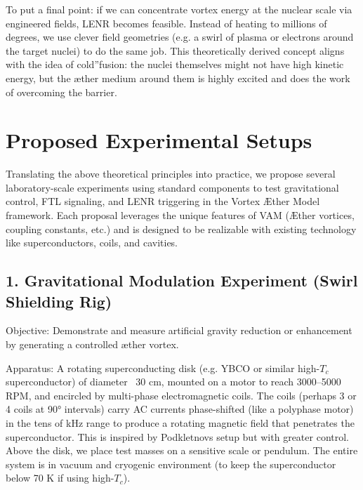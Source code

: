 To put a final point: if we can concentrate vortex energy at the nuclear scale via engineered fields, LENR becomes feasible. Instead of heating to millions of degrees, we use clever field geometries (e.g. a swirl of plasma or electrons around the target nuclei) to do the same job. This theoretically derived concept aligns with the idea of \grqq cold\textquotedblright fusion: the nuclei themselves might not have high kinetic energy, but the æther medium around them is highly excited and does the work of overcoming the barrier.


\section*{Proposed Experimental Setups}

Translating the above theoretical principles into practice, we propose several laboratory-scale experiments using standard components to test gravitational control, FTL signaling, and LENR triggering in the Vortex Æther Model framework. Each proposal leverages the unique features of VAM (Æther vortices, coupling constants, etc.) and is designed to be realizable with existing technology like superconductors, coils, and cavities.


\subsection*{1. Gravitational Modulation Experiment (Swirl Shielding Rig)}

Objective: Demonstrate and measure artificial gravity reduction or enhancement by generating a controlled æther vortex.


Apparatus: A rotating superconducting disk (e.g. YBCO or similar high-$T_c$ superconductor) of diameter ~30 cm, mounted on a motor to reach 3000–5000 RPM, and encircled by multi-phase electromagnetic coils. The coils (perhaps 3 or 4 coils at 90° intervals) carry AC currents phase-shifted (like a polyphase motor) in the tens of kHz range to produce a rotating magnetic field that penetrates the superconductor. This is inspired by Podkletnov\rqs s setup but with greater control. Above the disk, we place test masses on a sensitive scale or pendulum. The entire system is in vacuum and cryogenic environment (to keep the superconductor below 70 K if using high-$T_c$).


